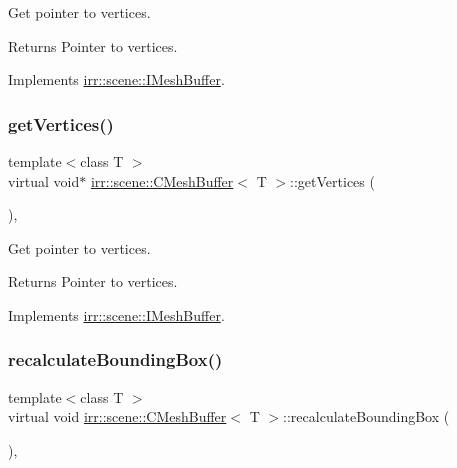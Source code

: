 Get pointer to vertices. 

\begin{DoxyReturn}{Returns}
Pointer to vertices. 
\end{DoxyReturn}


Implements \hyperlink{classirr_1_1scene_1_1IMeshBuffer_a99891e516246b2cff13b362a435c8028}{irr\+::scene\+::\+I\+Mesh\+Buffer}.

\mbox{\label{classirr_1_1scene_1_1CMeshBuffer_a9173c9d0c6f32890ab75dc501aaf5be6}} 
\subsubsection{\texorpdfstring{get\+Vertices()}{getVertices()}\hspace{0.1cm}{\footnotesize\ttfamily [2/2]}}
{\footnotesize\ttfamily template$<$class T $>$ \\
virtual void$\ast$ \hyperlink{classirr_1_1scene_1_1CMeshBuffer}{irr\+::scene\+::\+C\+Mesh\+Buffer}$<$ T $>$\+::get\+Vertices (\begin{DoxyParamCaption}{ }\end{DoxyParamCaption})\hspace{0.3cm}{\ttfamily [inline]}, {\ttfamily [virtual]}}



Get pointer to vertices. 

\begin{DoxyReturn}{Returns}
Pointer to vertices. 
\end{DoxyReturn}


Implements \hyperlink{classirr_1_1scene_1_1IMeshBuffer_ac1695efc198b05a086487606bc2783e7}{irr\+::scene\+::\+I\+Mesh\+Buffer}.

\mbox{\label{classirr_1_1scene_1_1CMeshBuffer_aad55263eaf019b090c8d1c3c5f7f4407}} 
\subsubsection{\texorpdfstring{recalculate\+Bounding\+Box()}{recalculateBoundingBox()}}
{\footnotesize\ttfamily template$<$class T $>$ \\
virtual void \hyperlink{classirr_1_1scene_1_1CMeshBuffer}{irr\+::scene\+::\+C\+Mesh\+Buffer}$<$ T $>$\+::recalculate\+Bounding\+Box (\begin{DoxyParamCaption}{ }\end{DoxyParamCaption})\hspace{0.3cm}{\ttfamily [inline]}, {\ttfamily [virtual]}}



